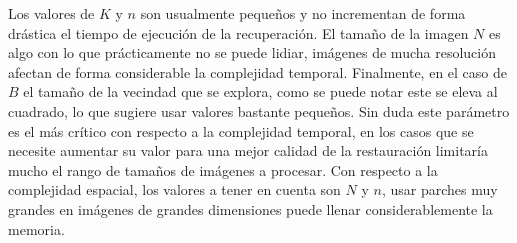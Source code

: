 Los valores de $K$ y $n$ son usualmente pequeños y no incrementan de forma drástica el tiempo de ejecuci\'on de la recuperaci\'on. El tamaño de la imagen $N$ es algo con lo que pr\'acticamente no se puede lidiar, im\'agenes de mucha resoluci\'on afectan de forma considerable la complejidad temporal. Finalmente, en el caso de $B$ el tamaño de la vecindad que se explora, como se puede notar este se eleva al cuadrado, lo que sugiere usar valores bastante pequeños. Sin duda este par\'ametro es el m\'as cr\'itico con respecto a la complejidad temporal, en los casos que se necesite aumentar su valor para una mejor calidad de la restauraci\'on limitar\'ia mucho el rango de tamaños de im\'agenes a procesar. Con respecto a la complejidad espacial, los valores a tener en cuenta son $N$ y $n$, usar parches muy grandes en im\'agenes de grandes dimensiones puede llenar considerablemente la memoria.


